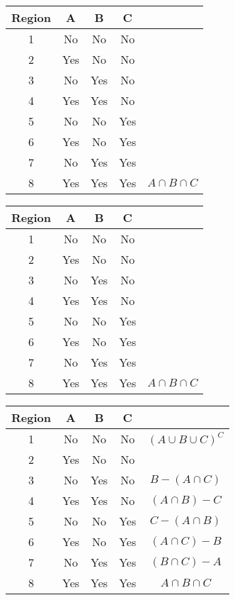 \begin{center}
	\begin{tabular}{|c|c|c|c|c|}
		\hline Region & A & B & C &  \\ 
		\hline 1 &\phantom{sp} No \phantom{sp}&\phantom{sp} No\phantom{sp} & \phantom{sp} No \phantom{sp} &  \\ 
		\hline 2 & Yes & No & No &  \\ 
		\hline 3 & No & Yes & No &  \\ 
		\hline 4 & Yes & Yes & No &  \\ 
		\hline 5 & No & No & Yes &  \\ 
		\hline 6 & Yes & No & Yes &  \\ 
		\hline 7 & No & Yes & Yes &  \\ 
		\hline 8 & Yes & Yes & Yes & $A \cap B \cap C$ \\ 
		\hline 
	\end{tabular}
\end{center} 

\begin{center}
	\begin{tabular}{|c|c|c|c|c|}
		\hline Region & A & B & C &  \\ 
		\hline 1 &\phantom{sp} No \phantom{sp}&\phantom{sp} No\phantom{sp} & \phantom{sp} No \phantom{sp} &  \\ 
		\hline 2 & Yes & No & No &  \\ 
		\hline 3 & No & Yes & No &  \\ 
		\hline 4 & Yes & Yes & No &  \\ 
		\hline 5 & No & No & Yes &  \\ 
		\hline 6 & Yes & No & Yes &  \\ 
		\hline 7 & No & Yes & Yes &  \\ 
		\hline 8 & Yes & Yes & Yes & $A \cap B \cap C$ \\ 
		\hline 
	\end{tabular}
\end{center} 

\begin{center}
	\begin{tabular}{|c|c|c|c|c|}
		\hline Region & A & B & C &  \\ 
		\hline 1 &\phantom{s} No \phantom{s}&\phantom{s} No\phantom{s} & \phantom{s} No \phantom{s} & $(A \cup B \cup C)^C$  \\ 
		\hline 2 & Yes & No & No &  \\ 
		\hline 3 & No & Yes & No &  $B-(A \cap C)$\\ 
		\hline 4 & Yes & Yes & No & $(A \cap B) - C$ \\ 
		\hline 5 & No & No & Yes &  $C-(A \cap B)$ \\ 
		\hline 6 & Yes & No & Yes & $(A \cap C) - B$ \\ 
		\hline 7 & No & Yes & Yes & $(B \cap C) - A$ \\ 
		\hline 8 & Yes & Yes & Yes & $A \cap B \cap C$ \\ 
		\hline 
	\end{tabular}
\end{center} 

